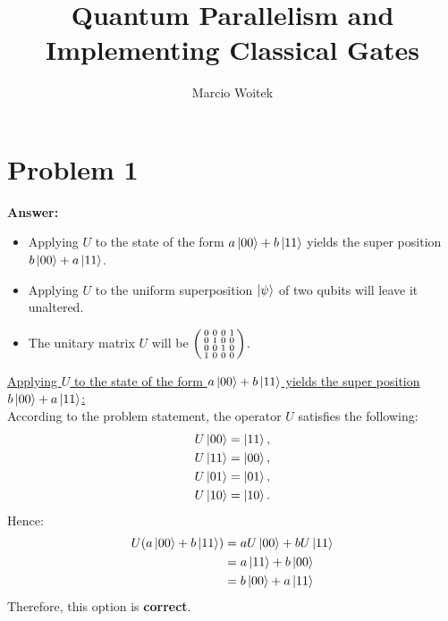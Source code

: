 \documentclass[10pt]{article}
\author{Marcio Woitek}
\date{}
\title{Quantum Parallelism and Implementing Classical Gates}
\begin{document}
\maketitle
\thispagestyle{empty}
\pagestyle{empty}
\section*{Problem 1}
\label{sec:orgc525722}
\textbf{Answer:}
\begin{itemize}
\item Applying \(U\) to the state of the form \(a\ket{00}+b\ket{11}\) yields the
super position \(b\ket{00}+a\ket{11}\).
\item Applying \(U\) to the uniform superposition \(\ket{\psi}\) of two qubits
will leave it unaltered.
\item The unitary matrix \(U\) will be \(\begin{psmallmatrix}
    0 & 0 & 0 & 1\\
    0 & 1 & 0 & 0\\
    0 & 0 & 1 & 0\\
    1 & 0 & 0 & 0
  \end{psmallmatrix}\).\\
\end{itemize}

\uline{Applying \(U\) to the state of the form \(a\ket{00}+b\ket{11}\) yields the
super position \(b\ket{00}+a\ket{11}\):}\\
According to the problem statement, the operator \(U\) satisfies the
following:
\begin{align}
  \begin{split}
    U\ket{00}&=\ket{11},\\
    U\ket{11}&=\ket{00},\\
    U\ket{01}&=\ket{01},\\
    U\ket{10}&=\ket{10}.
  \end{split}
\end{align}
Hence:
\begin{align}
  \begin{split}
    U(a\ket{00}+b\ket{11})&=aU\ket{00}+bU\ket{11}\\
    &=a\ket{11}+b\ket{00}\\
    &=b\ket{00}+a\ket{11}
  \end{split}
\end{align}
Therefore, this option is \textbf{correct}.\\
\end{document}
